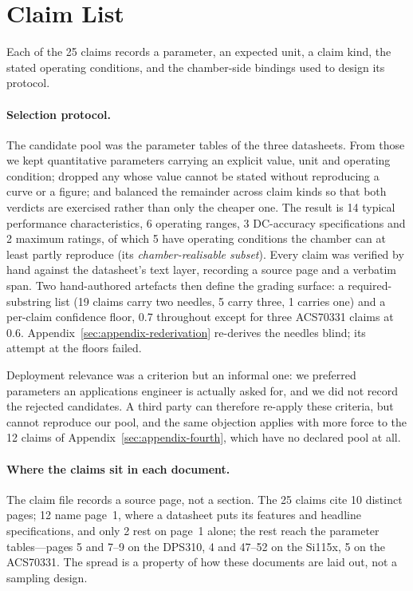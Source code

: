 \documentclass[11pt]{article}
\begin{document}
\section{Claim List}
\label{sec:appendix-claims}

Each of the 25 claims records a parameter, an expected unit, a claim
kind, the stated operating conditions, and the chamber-side bindings
used to design its protocol.

\paragraph{Selection protocol.}
The candidate pool was the parameter tables of the three datasheets.
From those we kept quantitative parameters carrying an explicit value,
unit and operating condition; dropped any whose value cannot be stated
without reproducing a curve or a figure; and balanced the remainder
across claim kinds so that both verdicts are exercised rather than only
the cheaper one. The result is 14 typical performance characteristics,
6 operating ranges, 3 DC-accuracy specifications and 2 maximum ratings,
of which 5 have operating conditions the chamber can at least partly
reproduce (its \emph{chamber-realisable subset}). Every claim was verified
by hand against the datasheet's text layer, recording a source page and
a verbatim span. Two hand-authored artefacts then define the grading
surface: a required-substring list (19 claims carry two needles, 5 carry
three, 1 carries one) and a per-claim
confidence floor, 0.7 throughout
except for three ACS70331 claims at 0.6. Appendix~\ref{sec:appendix-rederivation}
re-derives the needles blind; its attempt at the floors failed.

Deployment relevance was a criterion but an informal one: we preferred
parameters an applications engineer is actually asked for, and we did
not record the rejected candidates. A third party can therefore re-apply
these criteria, but cannot reproduce our pool, and the same objection
applies with more force to the 12 claims of
Appendix~\ref{sec:appendix-fourth}, which have no declared pool at all.

\paragraph{Where the claims sit in each document.}
The claim file records a source page, not a section. The 25
claims cite 10 distinct pages; 12 name page~1, where a datasheet
puts its features and headline specifications, and only 2 rest on page~1
alone; the rest reach the parameter tables---pages 5 and 7--9 on the
DPS310, 4 and 47--52 on the Si115x, 5 on the ACS70331. The spread is a
property of how these documents are laid out, not a sampling design.
\end{document}

